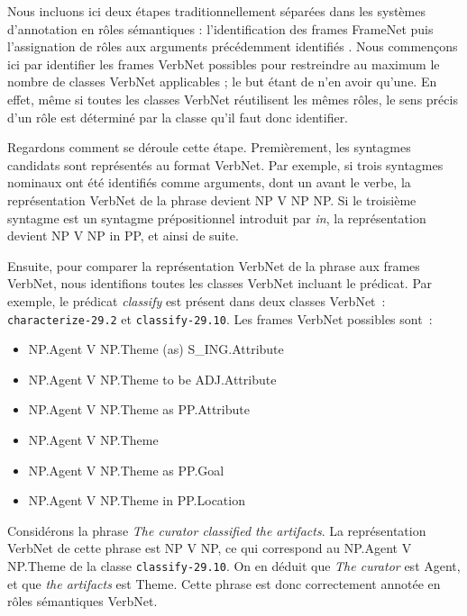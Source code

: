 Nous incluons ici deux étapes traditionnellement séparées dans les systèmes
d'annotation en rôles sémantiques : l'identification des frames FrameNet puis
l'assignation de rôles aux arguments précédemment identifiés
\citep{gildea2002automatic,das2014frame}. Nous commençons ici par identifier
les frames VerbNet possibles pour restreindre au maximum le nombre de classes
VerbNet applicables ; le but étant de n'en avoir qu'une. En effet, même si
toutes les classes VerbNet réutilisent les mêmes rôles, le sens précis d'un
rôle est déterminé par la classe qu'il faut donc identifier.

Regardons comment se déroule cette étape. Premièrement, les syntagmes candidats
sont représentés au format VerbNet. Par exemple, si trois syntagmes nominaux
ont été identifiés comme arguments, dont un avant le verbe, la représentation
VerbNet de la phrase devient NP V NP NP. Si le troisième syntagme est un
syntagme prépositionnel introduit par \textit{in}, la représentation devient NP
V NP in PP, et ainsi de suite.

Ensuite, pour comparer la représentation VerbNet de la phrase aux frames
VerbNet, nous identifions toutes les classes VerbNet incluant le prédicat. Par
exemple, le prédicat \textit{classify} est présent dans deux classes VerbNet~:
\texttt{characterize-29.2} et \texttt{classify-29.10}. Les frames VerbNet
possibles sont~:

\begin{itemize}
    \item NP.Agent V NP.Theme (as) S\_ING.Attribute
    \item NP.Agent V NP.Theme to be ADJ.Attribute
    \item NP.Agent V NP.Theme as PP.Attribute
    \item NP.Agent V NP.Theme
    \item NP.Agent V NP.Theme as PP.Goal
    \item NP.Agent V NP.Theme in PP.Location
\end{itemize}

Considérons la phrase \textit{The curator classified the artifacts}. La
représentation VerbNet de cette phrase est NP V NP, ce qui correspond au
NP.Agent V NP.Theme de la classe \texttt{classify-29.10}. On en déduit que
\textit{The curator} est Agent, et que \textit{the artifacts} est Theme. Cette
phrase est donc correctement annotée en rôles sémantiques VerbNet.

